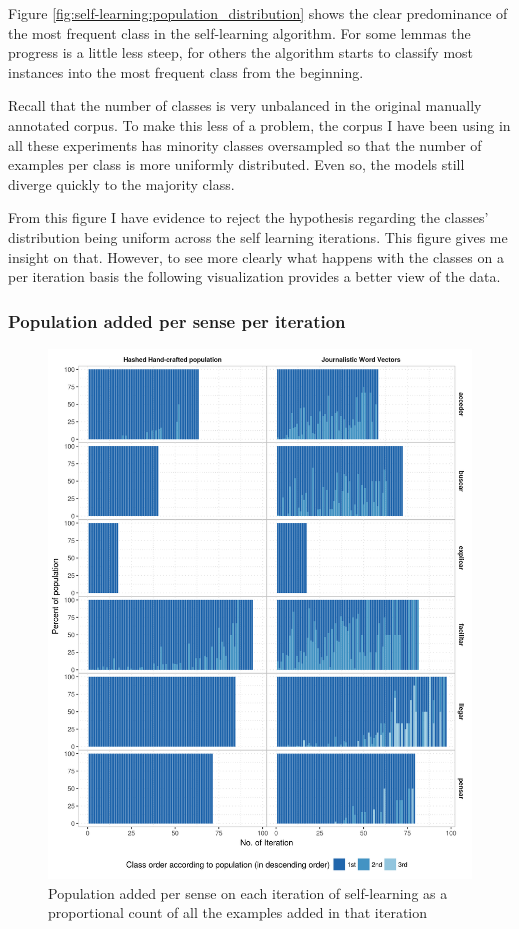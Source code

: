Figure \ref{fig:self-learning:population_distribution} shows the clear
predominance of the most frequent class in the self-learning algorithm. For
some lemmas the progress is a little less steep, for others the algorithm
starts to classify most instances into the most frequent class from the
beginning.

Recall that the number of classes is very unbalanced in the original manually
annotated corpus. To make this less of a problem, the corpus I have been using
in all these experiments has minority classes oversampled so that the number of
examples per class is more uniformly distributed. Even so, the models still
diverge quickly to the majority class.

From this figure I have evidence to reject the hypothesis regarding the
classes' distribution being uniform across the self learning iterations. This
figure gives me insight on that. However, to see more clearly what happens with
the classes on a per iteration basis the following visualization provides a
better view of the data.

\subsubsection{Population added per sense per iteration}

\begin{figure}[htb!]
  \centering
  \includegraphics[height=.9\textheight,width=\textwidth,keepaspectratio]
    {plots/selflearning/population_add_per_class}
  \caption{Population added per sense on each iteration of self-learning as a
  proportional count of all the examples added in that iteration}
  \label{fig:self-learning:population_add_per_class}
\end{figure}

